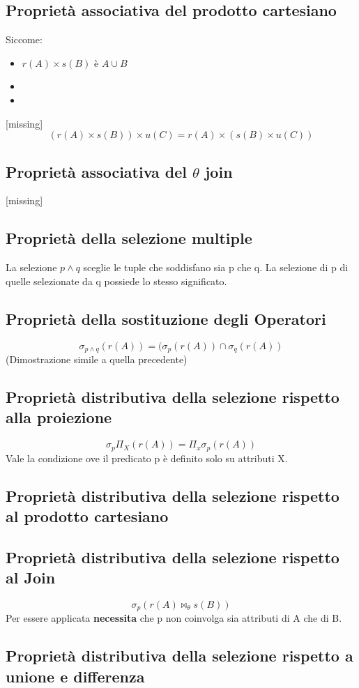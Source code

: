 \documentclass[10pt,twocolumn]{article}
\begin{document}
\subsection{Proprietà associativa del prodotto cartesiano}
Siccome:
\begin{itemize}
    \item $r(A) \times s(B)$ è $A\cup B$
    \item 
    \item 
\end{itemize}
[missing]
\[(r(A) \times s(B)) \times u(C) = r(A) \times (s(B) \times u(C))\]
\subsection{Proprietà associativa del $\theta$ join}
[missing]
\subsection{Proprietà della selezione multiple}
La selezione $ p \land q $ sceglie le tuple che soddisfano sia p che q. La selezione di p di quelle selezionate da q possiede lo stesso significato.
\subsection{Proprietà della sostituzione degli Operatori}
\[\sigma _{p \land q} (r(A)) = (\sigma_p (r(A)) \cap \sigma_q (r(A))\]
(Dimostrazione simile a quella precedente)
\subsection{Proprietà distributiva della selezione rispetto alla proiezione}
\[\sigma_p \Pi_X(r(A)) = \Pi_x\sigma_p(r(A))   \]
Vale la condizione ove il predicato p è definito solo su attributi X.
\subsection{Proprietà distributiva della selezione rispetto al prodotto cartesiano}
\subsection{Proprietà distributiva della selezione rispetto al Join}
\[\sigma_p (r(A)\bowtie_\theta s(B))\]
Per essere applicata \textbf{necessita} che p non coinvolga sia attributi di A che di B.
\subsection{Proprietà distributiva della selezione rispetto a unione e differenza}
\end{document}
